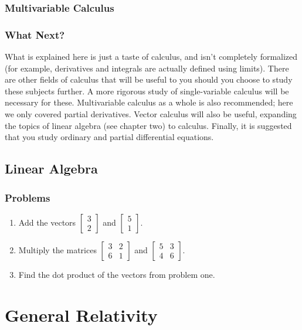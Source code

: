 \documentclass{memoir}
\begin{document}
\section{Multivariable Calculus}

\section{What Next?}
What is explained here is just a taste of calculus, and isn't completely formalized (for example, derivatives and integrals are actually defined using limits). There are other fields of calculus that will be useful to you should you choose to study these subjects further. A more rigorous study of single-variable calculus will be necessary for  these. Multivariable calculus as a whole is also recommended; here we only covered partial derivatives. Vector calculus will also be useful, expanding the topics of linear algebra (see chapter two) to calculus. Finally, it is suggested that you study ordinary and partial differential equations. 
\chapter{Linear Algebra}

\section{Problems}
\begin{enumerate}
\item Add the vectors $\begin{bmatrix}3\\2\end{bmatrix}$ and $\begin{bmatrix}5\\1\end{bmatrix}$.
\item Multiply the matrices $\begin{bmatrix}3&2\\6&1\end{bmatrix}$ and $\begin{bmatrix}5&3\\4&6\end{bmatrix}$.
\item Find the dot product of the vectors from problem one.
\end{enumerate}
\part{General Relativity}
\end{document}
